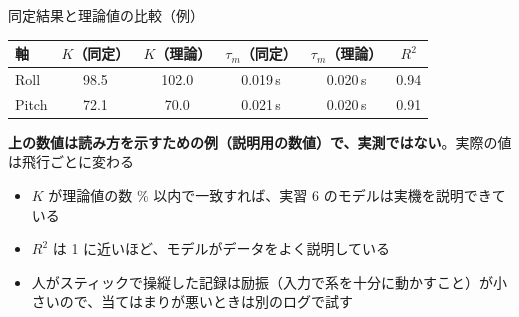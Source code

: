 \begin{frame}{同定結果と理論値の比較（例）}
  \begin{table}
    \centering\footnotesize
    \begin{tabular}{lccccc}
      \hline
      \textbf{軸} & \textbf{$K$（同定）} & \textbf{$K$（理論）} & \textbf{$\tau_m$（同定）} & \textbf{$\tau_m$（理論）} & \textbf{$R^2$} \\
      \hline
      Roll  & 98.5 & 102.0 & 0.019\,s & 0.020\,s & 0.94 \\
      Pitch & 72.1 &  70.0 & 0.021\,s & 0.020\,s & 0.91 \\
      \hline
    \end{tabular}
  \end{table}
  {\footnotesize \textbf{上の数値は読み方を示すための例（説明用の数値）で、実測ではない}。実際の値は飛行ごとに変わる\par}

  \vspace{0.4em}

  \begin{itemize}\footnotesize\setlength{\itemsep}{3pt}
    \item $K$ が理論値の数 \% 以内で一致すれば、実習 6 のモデルは実機を説明できている
    \item $R^2$ は 1 に近いほど、モデルがデータをよく説明している
    \item 人がスティックで操縦した記録は励振（入力で系を十分に動かすこと）が小さいので、当てはまりが悪いときは別のログで試す
  \end{itemize}
\end{frame}
